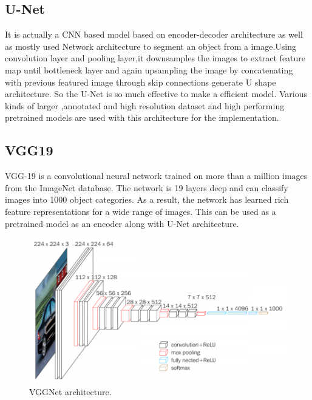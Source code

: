 \documentclass[a4paper,12pt,oneside]{book}
\begin{document}
\subsection{U-Net}
It is actually a CNN based model based on encoder-decoder architecture as well as mostly used Network architecture to segment an object from a image.Using convolution layer and pooling layer,it downsamples the images to extract feature map until bottleneck layer and again upsampling the image by concatenating with previous featured image through skip connections generate U shape architecture. So the U-Net \cite{unetwotk} is so much effective to make a efficient model. Various kinds of larger ,annotated and high resolution dataset and high performing pretrained models are used with this architecture for the implementation.
\subsection{VGG19}
VGG-19 \cite{simonyan2015deep} is a convolutional neural network trained on more than a million images from the ImageNet database. The network is 19 layers deep and can classify images into 1000 object categories. As a result, the network has learned rich feature representations for a wide range of images. This can be used as a pretrained model as an encoder along with U-Net architecture. 
\\
\begin{figure}[!hbtp]
\centering
\includegraphics[width=1\textwidth]{Figures/vgg19.png}
\captionsetup{font=small}
\vspace{10pt}
\caption{VGGNet architecture.}
\label{fig:unet}
\end{figure}
\end{document}
